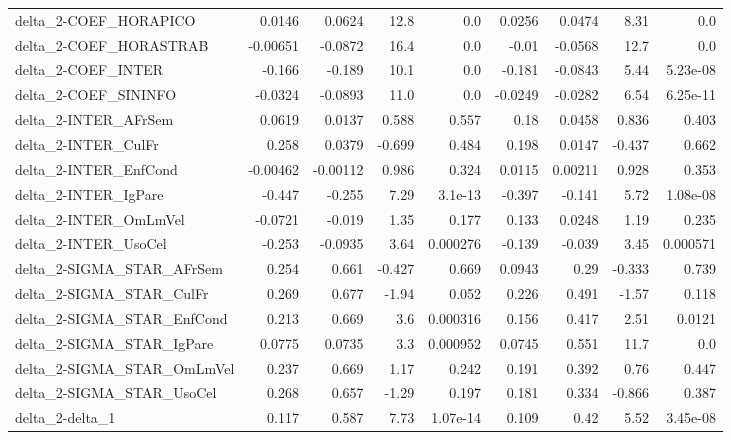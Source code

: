 \begin{tabular}{lrrrrrrrr}
delta\_2-COEF\_HORAPICO                 &      0.0146 &       0.0624 &    12.8 &      0.0 &     0.0256 &      0.0474 &         8.31 &           0.0 \\
delta\_2-COEF\_HORASTRAB                &    -0.00651 &      -0.0872 &    16.4 &      0.0 &      -0.01 &     -0.0568 &         12.7 &           0.0 \\
delta\_2-COEF\_INTER                    &      -0.166 &       -0.189 &    10.1 &      0.0 &     -0.181 &     -0.0843 &         5.44 &      5.23e-08 \\
delta\_2-COEF\_SININFO                  &     -0.0324 &      -0.0893 &    11.0 &      0.0 &    -0.0249 &     -0.0282 &         6.54 &      6.25e-11 \\
delta\_2-INTER\_AFrSem                  &      0.0619 &       0.0137 &   0.588 &    0.557 &       0.18 &      0.0458 &        0.836 &         0.403 \\
delta\_2-INTER\_CulFr                   &       0.258 &       0.0379 &  -0.699 &    0.484 &      0.198 &      0.0147 &       -0.437 &         0.662 \\
delta\_2-INTER\_EnfCond                 &    -0.00462 &     -0.00112 &   0.986 &    0.324 &     0.0115 &     0.00211 &        0.928 &         0.353 \\
delta\_2-INTER\_IgPare                  &      -0.447 &       -0.255 &    7.29 &  3.1e-13 &     -0.397 &      -0.141 &         5.72 &      1.08e-08 \\
delta\_2-INTER\_OmLmVel                 &     -0.0721 &       -0.019 &    1.35 &    0.177 &      0.133 &      0.0248 &         1.19 &         0.235 \\
delta\_2-INTER\_UsoCel                  &      -0.253 &      -0.0935 &    3.64 & 0.000276 &     -0.139 &      -0.039 &         3.45 &      0.000571 \\
delta\_2-SIGMA\_STAR\_AFrSem             &       0.254 &        0.661 &  -0.427 &    0.669 &     0.0943 &        0.29 &       -0.333 &         0.739 \\
delta\_2-SIGMA\_STAR\_CulFr              &       0.269 &        0.677 &   -1.94 &    0.052 &      0.226 &       0.491 &        -1.57 &         0.118 \\
delta\_2-SIGMA\_STAR\_EnfCond            &       0.213 &        0.669 &     3.6 & 0.000316 &      0.156 &       0.417 &         2.51 &        0.0121 \\
delta\_2-SIGMA\_STAR\_IgPare             &      0.0775 &       0.0735 &     3.3 & 0.000952 &     0.0745 &       0.551 &         11.7 &           0.0 \\
delta\_2-SIGMA\_STAR\_OmLmVel            &       0.237 &        0.669 &    1.17 &    0.242 &      0.191 &       0.392 &         0.76 &         0.447 \\
delta\_2-SIGMA\_STAR\_UsoCel             &       0.268 &        0.657 &   -1.29 &    0.197 &      0.181 &       0.334 &       -0.866 &         0.387 \\
delta\_2-delta\_1                       &       0.117 &        0.587 &    7.73 & 1.07e-14 &      0.109 &        0.42 &         5.52 &      3.45e-08 \\
\bottomrule
\end{tabular}
